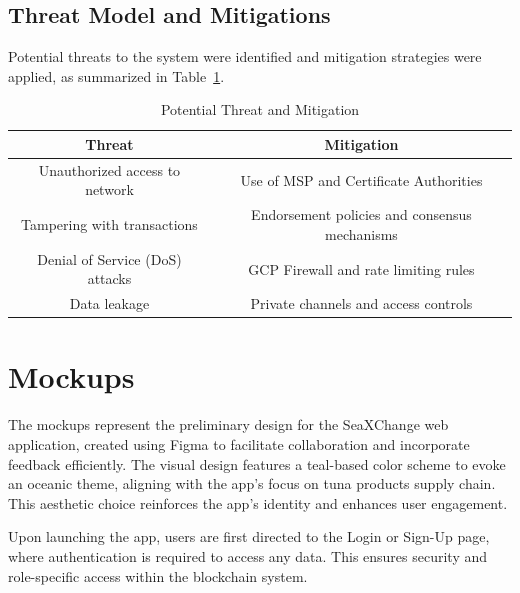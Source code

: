 \subsection{Threat Model and Mitigations}
Potential threats to the system were identified and mitigation strategies were applied, as summarized in Table~\ref{tab:threat}.
\begin{table}[h]
	\centering
	\begin{tabular}{|c|c|}
		\hline
		\textbf{Threat} & \textbf{Mitigation} \\
		\hline
		Unauthorized access to network & Use of MSP and Certificate Authorities \\
		\hline
		Tampering with transactions & Endorsement policies and consensus mechanisms \\
		\hline
		Denial of Service (DoS) attacks & GCP Firewall and rate limiting rules \\
		\hline
		Data leakage & Private channels and access controls \\
		\hline
	\end{tabular}
	\caption{Potential Threat and Mitigation}
	\label{tab:threat}
\end{table}


\section{Mockups}
The mockups represent the preliminary design for the SeaXChange web application, created using Figma to facilitate collaboration and incorporate feedback efficiently. The visual design features a teal-based color scheme to evoke an oceanic theme, aligning with the app’s focus on tuna products supply chain. This aesthetic choice reinforces the app’s identity and enhances user engagement.

Upon launching the app, users are first directed to the Login or Sign-Up page, where authentication is required to access any data. This ensures security and role-specific access within the blockchain system.

